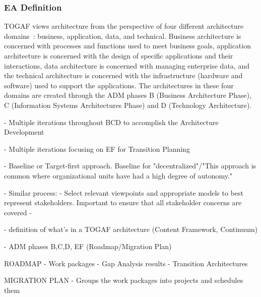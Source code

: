 \subsubsection{EA Definition}
TOGAF views architecture from the perspective of four different architecture domains~\cite{sessions2007}: business, application, data, and technical. Business architecture is concerned with processes and functions used to meet business goals, application architecture is concerned with the design of specific applications and their interactions, data architecture is concerned with managing enterprise data, and the technical architecture is concerned with the infrastructure (hardware and software) used to support the applications. The architectures in these four domains are created through the ADM phases B (Business Architecture Phase), C (Information Systems Architectures Phase) and D (Technology Architecture).

- Multiple iterations throughout BCD to accomplish the Architecture Development

- Multiple iterations focusing on EF for Transition Planning

- Baseline or Target-first approach. Baseline for "decentralized"/"This approach is common where organizational units have had a high degree of autonomy."

- Similar process:
    - Select relevant viewpoints and appropriate models to best represent stakeholders. Important to ensure that all stakeholder concerns are covered
    - 


- definition of what's in a TOGAF architecture (Content Framework, Continuum)

- ADM phases B,C,D, EF (Roadmap/Migration Plan)

ROADMAP
- Work packages
- Gap Analysis results
- Transition Architectures

MIGRATION PLAN
- Groups the work packages into projects and schedules them

